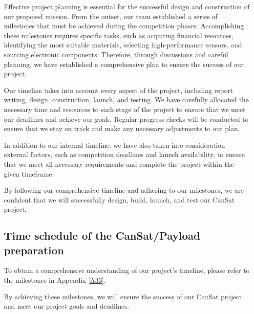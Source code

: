 Effective project planning is essential for the successful design and construction of our proposed mission. From the outset, our team established a series of milestones that must be achieved during the competition phases. Accomplishing these milestones requires specific tasks, such as acquiring financial resources, identifying the most suitable materials, selecting high-performance sensors, and sourcing electronic components. Therefore, through discussions and careful planning, we have established a comprehensive plan to ensure the success of our project.

Our timeline takes into account every aspect of the project, including report writing, design, construction, launch, and testing. We have carefully allocated the necessary time and resources to each stage of the project to ensure that we meet our deadlines and achieve our goals. Regular progress checks will be conducted to ensure that we stay on track and make any necessary adjustments to our plan.

In addition to our internal timeline, we have also taken into consideration external factors, such as competition deadlines and launch availability, to ensure that we meet all necessary requirements and complete the project within the given timeframe.

By following our comprehensive timeline and adhering to our milestones, we are confident that we will successfully design, build, launch, and test our CanSat project.

\subsection{Time schedule of the CanSat/Payload preparation}\label{time_schedule}
To obtain a comprehensive understanding of our project's timeline, please refer to the milestones in Appendix \ref{A33}. 

By achieving these milestones, we will ensure the success of our CanSat project and meet our project goals and deadlines.

